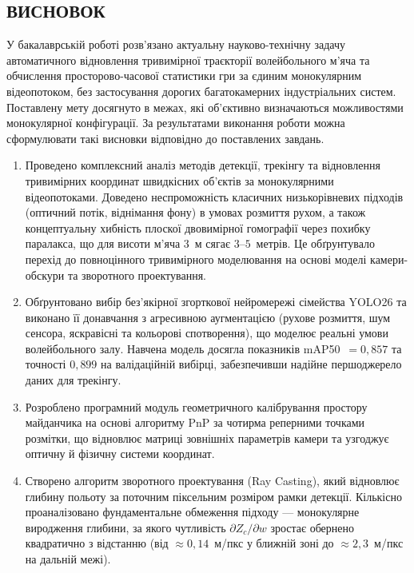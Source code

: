 

\begin{unnumbered}

\section{ВИСНОВОК}

У бакалаврській роботі розв'язано актуальну науково-технічну задачу автоматичного
відновлення тривимірної траєкторії волейбольного м'яча та обчислення просторово-часової
статистики гри за єдиним монокулярним відеопотоком, без застосування дорогих
багатокамерних індустріальних систем. Поставлену мету досягнуто в межах, які об'єктивно
визначаються можливостями монокулярної конфігурації. За результатами виконання роботи
можна сформулювати такі висновки відповідно до поставлених завдань.

\begin{enumerate}
    \item Проведено комплексний аналіз методів детекції, трекінгу та відновлення
    тривимірних координат швидкісних об'єктів за монокулярними відеопотоками. Доведено
    неспроможність класичних низькорівневих підходів (оптичний потік, віднімання фону)
    в умовах розмиття рухом, а також концептуальну хибність плоскої двовимірної
    гомографії через похибку паралакса, що для висоти м'яча $3$~м сягає $3$--$5$~метрів.
    Це обґрунтувало перехід до повноцінного тривимірного моделювання на основі моделі
    камери-обскури та зворотного проектування.

    \item Обґрунтовано вибір без'якірної згорткової нейромережі сімейства \gls{YOLO}26 та
    виконано її донавчання з агресивною аугментацією (рухове розмиття, шум сенсора,
    яскравісні та кольорові спотворення), що моделює реальні умови волейбольного залу.
    Навчена модель досягла показників mAP50~$=0{,}857$ та точності $0{,}899$ на
    валідаційній вибірці, забезпечивши надійне першоджерело даних для трекінгу.

    \item Розроблено програмний модуль геометричного калібрування простору майданчика на
    основі алгоритму \gls{PnP} за чотирма реперними точками розмітки, що відновлює
    матриці зовнішніх параметрів камери та узгоджує оптичну й фізичну системи координат.

    \item Створено алгоритм зворотного проектування (Ray Casting), який відновлює глибину
    польоту за поточним піксельним розміром рамки детекції. Кількісно проаналізовано
    фундаментальне обмеження підходу --- монокулярне виродження глибини, за якого
    чутливість $\partial Z_c/\partial w$ зростає обернено квадратично з відстанню (від
    $\approx 0{,}14$~м/пкс у ближній зоні до $\approx 2{,}3$~м/пкс на дальній межі).


\end{enumerate}
\end{unnumbered}
